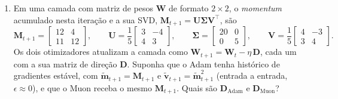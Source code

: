 \documentclass{dlproblemset}
\begin{document}
\begin{enumerate}[1)]
    \item Em uma camada com matriz de pesos $\mathbf{W}$ de formato $2 \times 2$, o \textit{momentum} acumulado nesta iteração e a sua SVD, $\mathbf{M}_{t+1} = \mathbf{U}\boldsymbol{\Sigma}\mathbf{V}^{\top}$, são
    \[
    \mathbf{M}_{t+1} = \begin{bmatrix} 12 & 4 \\ 11 & 12 \end{bmatrix}, \qquad
    \mathbf{U} = \frac{1}{5}\begin{bmatrix} 3 & -4 \\ 4 & 3 \end{bmatrix}, \qquad
    \boldsymbol{\Sigma} = \begin{bmatrix} 20 & 0 \\ 0 & 5 \end{bmatrix}, \qquad
    \mathbf{V} = \frac{1}{5}\begin{bmatrix} 4 & -3 \\ 3 & 4 \end{bmatrix}.
    \]
    Os dois otimizadores atualizam a camada como $\mathbf{W}_{t+1} = \mathbf{W}_t - \eta\,\mathbf{D}$, cada um com a sua matriz de direção $\mathbf{D}$. Suponha que o Adam tenha histórico de gradientes estável, com $\widetilde{\mathbf{m}}_{t+1} = \mathbf{M}_{t+1}$ e $\widetilde{\mathbf{v}}_{t+1} = \widetilde{\mathbf{m}}_{t+1}^{2}$ (entrada a entrada, $\epsilon \approx 0$), e que o Muon receba o mesmo $\mathbf{M}_{t+1}$. Quais são $\mathbf{D}_{\text{Adam}}$ e $\mathbf{D}_{\text{Muon}}$?


\end{enumerate}
\end{document}

